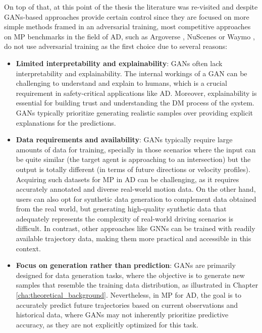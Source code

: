 On top of that, at this point of the thesis the literature was re-visited and despite \acp{GAN}-based approaches \cite{sadeghian2019sophie, dendorfer2020goal, gupta2018social, gomez2022exploring} provide certain control since they are focused on more simple methods framed in an adversarial training, most competitive approaches on \ac{MP} benchmarks in the field of \ac{AD}, such as Argoverse \cite{chang2019argoverse}, NuScenes \cite{caesar2020nuscenes} or Waymo \cite{ettinger2021large}, do not use adversarial training as the first choice due to several reasons:

\begin{itemize}
	
	\item \textbf{Limited interpretability and explainability}: \acp{GAN} often lack interpretability and explainability. The internal workings of a \ac{GAN} can be challenging to understand and explain to humans, which is a crucial requirement in safety-critical applications like \ac{AD}. Moreover, explainability is essential for building trust and understanding the \ac{DM} process of the system. \acp{GAN} typically prioritize generating realistic samples over providing explicit explanations for the predictions.
	
	\item \textbf{Data requirements and availability}: \acp{GAN} typically require large amounts of data for training, specially in those scenarios where the input can be quite similar (the target agent is approaching to an intersection) but the output is totally different (in terms of future directions or velocity profiles). Acquiring such datasets for \ac{MP} in \ac{AD} can be challenging, as it requires accurately annotated and diverse real-world motion data. On the other hand, users can also opt for synthetic data generation to complement data obtained from the real world, but generating high-quality synthetic data that adequately represents the complexity of real-world driving scenarios is difficult. In contrast, other approaches like \acp{GNN} can be trained with readily available trajectory data, making them more practical and accessible in this context.
	
	\item \textbf{Focus on generation rather than prediction}: \acp{GAN} are primarily designed for data generation tasks, where the objective is to generate new samples that resemble the training data distribution, as illustrated in Chapter \ref{cha:theoretical_background}. Nevertheless, in \ac{MP} for \ac{AD}, the goal is to accurately predict future trajectories based on current observations and historical data, where \acp{GAN} may not inherently prioritize predictive accuracy, as they are not explicitly optimized for this task.
	
\end{itemize}

